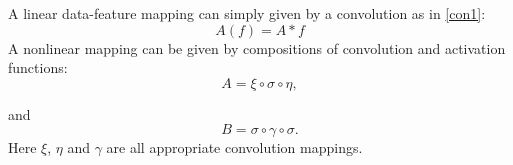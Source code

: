 A linear data-feature mapping can simply given by a convolution as in \eqref{con1}:
\begin{equation}
	\label{linearA}
	A(f)=A\ast f
\end{equation}
A nonlinear mapping can be given by compositions of convolution and
activation functions:
\begin{equation}
	\label{nonlinearA}
	A=\xi\circ\sigma\circ\eta ,
\end{equation}

and 
\begin{equation}
	\label{extractor}
	B=\sigma\circ \gamma \circ\sigma  .
\end{equation}
Here $\xi$, $\eta$ and $\gamma$ are all 
appropriate convolution mappings.
